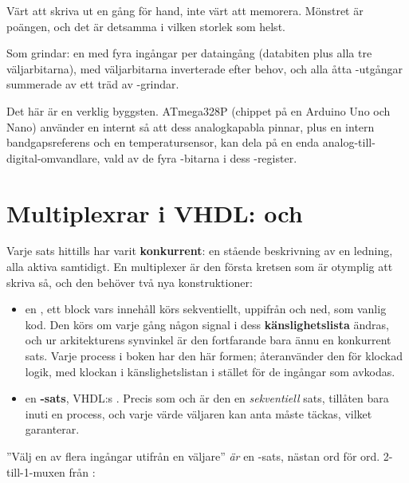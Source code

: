 Värt att skriva ut en gång för hand, inte värt att memorera. Mönstret är poängen, och det är
detsamma i vilken storlek som helst.

Som grindar: en  med fyra ingångar per dataingång (databiten plus alla tre
väljarbitarna), med väljarbitarna inverterade efter behov, och alla åtta -utgångar
summerade av ett träd av -grindar.


Det här är en verklig byggsten. ATmega328P (chippet på en Arduino Uno och Nano) använder en
internt så att dess analogkapabla pinnar, plus en intern bandgapsreferens och en temperatursensor,
kan dela på en enda analog-till-digital-omvandlare, vald av de fyra -bitarna i dess
-register.

\section{Multiplexrar i VHDL:  och }
\label{c2:sec:process}

Varje sats hittills har varit \textbf{konkurrent}: en stående beskrivning av en ledning, alla
aktiva samtidigt. En multiplexer är den första kretsen som är otymplig att skriva så, och den
behöver två nya konstruktioner:
\begin{itemize}
  \item en \textbf{}, ett block vars innehåll körs sekventiellt, uppifrån och ned,
    som vanlig kod. Den körs om varje gång någon signal i dess \textbf{känslighetslista} ändras,
    och ur arkitekturens synvinkel är den fortfarande bara ännu en konkurrent sats. Varje process
    i boken har den här formen;  återanvänder den för klockad logik, med klockan i
    känslighetslistan i stället för de ingångar som avkodas.
  \item en \textbf{-sats}, VHDL:s . Precis som  och  är
    den en \emph{sekventiell} sats, tillåten bara inuti en process, och varje värde väljaren kan
    anta måste täckas, vilket  garanterar.
\end{itemize}

”Välj en av flera ingångar utifrån en väljare” \emph{är} en -sats, nästan ord för ord.
2-till-1-muxen från :

